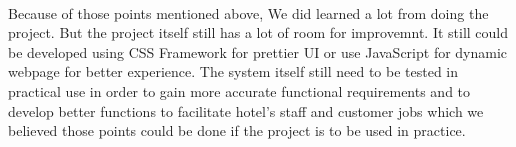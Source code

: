       \paragraph{}
        Because of those points mentioned above, We did learned a lot from doing the project. But the project itself still has a lot of room for
         improvemnt. It still could be developed using CSS Framework for prettier UI or use JavaScript for dynamic webpage for better experience.
         The system itself still need to be tested in practical use in order to gain more accurate functional requirements and to develop better
          functions to facilitate hotel's staff and customer jobs which we believed those points could be done if the project is to be used in practice.




